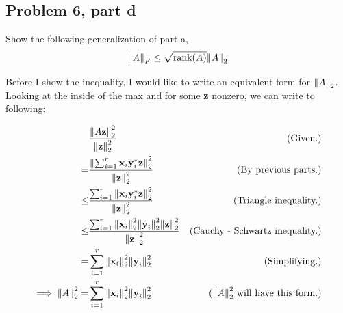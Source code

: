 \newpage
\subsection{Problem 6, part d}
Show the following generalization of part a,
\[
\norm{A}_F \leq \sqrt{\text{rank}(A)}\norm{A}_2
\]
\partbreak
\begin{solution}

    Before I show the inequality, I would like to write an equivalent form for $\norm{A}_2$. Looking at the inside of the max and for some \textbf{z} nonzero, we can write to following:

    \alignbreak
    \begin{align}
    &\frac{\norm{A\textbf{z}}_2^2}{\norm{\textbf{z}}_2^2} &\text{(Given.)}\nonumber\\
    =& \frac{\norm{\sum_{i = 1}^r\textbf{x}_i\textbf{y}_i^*\textbf{z}}_2^2}{\norm{\textbf{z}}_2^2} &\text{(By previous parts.)}\nonumber\\
    \leq& \frac{\sum_{i = 1}^r\norm{\textbf{x}_i\textbf{y}_i^*\textbf{z}}_2^2}{\norm{\textbf{z}}_2^2} &\text{(Triangle inequality.)}\nonumber\\
    \leq& \frac{\sum_{i = 1}^r\norm{\textbf{x}_i}_2^2\norm{\textbf{y}_i}_2^2\norm{\textbf{z}}_2^2}{\norm{\textbf{z}}_2^2} &\text{(Cauchy - Schwartz inequality.)}\nonumber\\
    =&\sum_{i = 1}^r\norm{\textbf{x}_i}_2^2\norm{\textbf{y}_i}_2^2 &\text{(Simplifying.)}\nonumber\\
    \implies \norm{A}_2^2 =& \sum_{i = 1}^r\norm{\textbf{x}_i}_2^2\norm{\textbf{y}_i}_2^2 &\text{($\norm{A}_2^2$ will have this form.)} \label{p6d: norm A2 form}
    \end{align}
    \alignbreak


\end{solution}
